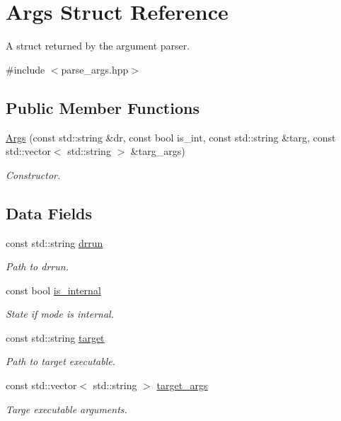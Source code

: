 \hypertarget{struct_args}{}\section{Args Struct Reference}
\label{struct_args}


A struct returned by the argument parser.  




{\ttfamily \#include $<$parse\+\_\+args.\+hpp$>$}

\subsection*{Public Member Functions}
\begin{DoxyCompactItemize}
\item 
\hyperlink{struct_args_af97cebd8b7d77d0e4bd6a35066cfe23a}{Args} (const std\+::string \&dr, const bool is\+\_\+int, const std\+::string \&targ, const std\+::vector$<$ std\+::string $>$ \&targ\+\_\+args)
\begin{DoxyCompactList}\small\item\em Constructor. \end{DoxyCompactList}\end{DoxyCompactItemize}
\subsection*{Data Fields}
\begin{DoxyCompactItemize}
\item 
const std\+::string \hyperlink{struct_args_afd47a15e870aaf33b2ad41f55aebaa4e}{drrun}
\begin{DoxyCompactList}\small\item\em Path to drrun. \end{DoxyCompactList}\item 
const bool \hyperlink{struct_args_a52d1f8c8297b000e30ff84b9ff1b9321}{is\+\_\+internal}
\begin{DoxyCompactList}\small\item\em State if mode is internal. \end{DoxyCompactList}\item 
const std\+::string \hyperlink{struct_args_a49f5255b7466ee4e1329aa32ca069da6}{target}
\begin{DoxyCompactList}\small\item\em Path to target executable. \end{DoxyCompactList}\item 
const std\+::vector$<$ std\+::string $>$ \hyperlink{struct_args_aa9f8e387df0b3691352daf352876176d}{target\+\_\+args}
\begin{DoxyCompactList}\small\item\em Targe executable arguments. \end{DoxyCompactList}\end{DoxyCompactItemize}



